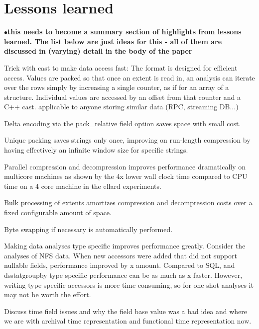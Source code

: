 \documentclass{acm_proc_article-sp}
\newcommand{\fix}[1]{{\LARGE\ensuremath{\bullet}}\textbf{#1}}
\begin{document}

\iffalse

\section{Lessons learned}\label{sec:lessonslearned}

\fix{this needs to become a summary section of highlights from lessons
learned. The list below are just ideas for this - all of them are discussed
in (varying) detail in the body of the paper}

Trick with cast to make data access fast: The format is designed for
efficient access. Values are packed so that once an extent is read in,
an analysis can iterate over the rows simply by increasing a single
counter, as if for an array of a structure.  Individual values are
accessed by an offset from that counter and a C++ cast.  applicable to
anyone storing similar data (RPC, streaming DB...)

Delta encoding via the pack\_relative field option saves space
with small cost.

Unique packing saves strings only once, improving on run-length
compression by having effectively an infinite window size for specific
strings.

Parallel compression and decompression improves performance
dramatically on multicore machines as shown by the 4x lower wall clock
time compared to CPU time on a 4 core machine in the ellard experiments.

Bulk processing of extents amortizes compression and decompression
costs over a fixed configurable amount of space.

Byte swapping if necessary is automatically performed.

Making data analyses type specific improves performance greatly.
Consider the analyses of NFS data.  When new accessors were added that
did not support nullable fields, performance improved by x amount.
Compared to SQL, and dsstatgroupby type specific performance can be as
much as x faster.  However, writing type specific accessors is more
time consuming, so for one shot analyses it may not be worth the
effort.

Discuss time field issues and why the field base value was a bad idea
and where we are with archival time representation and functional time
representation now.
\end{document}
